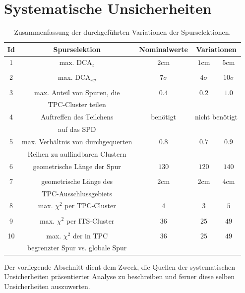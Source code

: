 \documentclass[12pt,a4paper]{report}
\begin{document}
\section{Systematische Unsicherheiten}
\begin{table}
\centering
\begin{tabular}{|c|c|c|c|c|}
\hline
\multicolumn{1}{|c|}{\textbf{Id}} & \multicolumn{1}{|c|}{\textbf{Spurselektion}} & \multicolumn{1}{|c|}{\textbf{Nominalwerte}} & \multicolumn{2}{|c|}{\textbf{Variationen}}\\
\hline
1 & max. $\mathrm{DCA}_{z}$ & $2 \mathrm{cm}$ & $1 \mathrm{cm}$ & $5 \mathrm{cm}$\\
 & & & &\\
\hline
2 & max. $\mathrm{DCA}_{xy}$ & $7\sigma$ & $4\sigma$ & $10\sigma$\\
 & & & &\\
\hline
3 & max. Anteil von Spuren, die & $0.4$ & $0.2$ & $1.0$\\
& TPC-Cluster teilen & & &\\
\hline
4 & Auftreffen des Teilchens & benötigt & \multicolumn{2}{|c|}{nicht benötigt}\\
 & auf das SPD & & \multicolumn{2}{|c|}{ }\\
\hline
5 & max. Verhältnis von durchgequerten & $0.8$ & $0.7$ & $0.9$\\
  &  Reihen zu auffindbaren Clustern & & &\\
\hline
6 & geometrische Länge der Spur & $130$ & $120$ & $140$\\
 &  & & &\\
\hline
7 & geometrische Länge des & $2 \mathrm{cm}$ & $2 \mathrm{cm}$ & $4 \mathrm{cm}$\\
 & TPC-Ausschlussgebiets & & &\\
\hline
8 & max. $\chi^2$ per TPC-Cluster & $4$ & $3$ & $5$\\
 &  & & & \\
\hline
9 & max. $\chi^2$ per ITS-Cluster  & $36$ & $25$ & $49$\\
 &  & & &\\
\hline
10 & max. $\chi^2$ der in TPC  & $36$ & $25$ & $49$\\
 &  begrenzter Spur vs. globale Spur & & &\\
\hline
\end{tabular}
\caption{Zusammenfassung der durchgeführten Variationen der Spurselektionen.}
\label{tab:SysUnsich}
\end{table}
Der vorliegende Abschnitt dient dem Zweck, die Quellen der systematischen Unsicherheiten präsentierter Analyse zu beschreiben und ferner diese selben Unsicherheiten auszuwerten.\\
\end{document}
